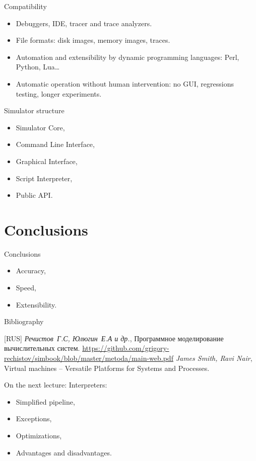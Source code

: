\begin{frame}{Compatibility}
\begin{itemize}
\item Debuggers, IDE, tracer and trace analyzers.
\item File formats: disk images, memory images, traces.
\item Automation and extensibility by dynamic programming languages: Perl,
  Python, Lua\dots
\item Automatic operation without human intervention: no GUI, regressions
  testing, longer experiments.
\end{itemize}
\end{frame}

\begin{frame}{Simulator structure}
\begin{itemize}
\item Simulator Core,
\item Command Line Interface,
\item Graphical Interface,
\item Script Interpreter,
\item Public API.
\end{itemize}
\end{frame}

\section*{Conclusions}

\begin{frame}{Conclusions}
\begin{itemize}
\item Accuracy,
\item Speed,
\item Extensibility.
\end{itemize}
\end{frame}

\begin{frame}[allowframebreaks]{Bibliography}
\begin{thebibliography}{99}
  \bibitem{} [RUS] \textit{Речистов~Г.С, Юлюгин~Е.А и др.},
    Программное моделирование вычислительных систем.
    \url{https://github.com/grigory-rechistov/simbook/blob/master/metoda/main-web.pdf}
  \bibitem{} \textit{James Smith, Ravi Nair}, Virtual machines -- Versatile
    Platforms for Systems and Processes.
\end{thebibliography}
\end{frame}

\begin{frame}{On the next lecture:}
Interpreters:
\begin{itemize}
\item Simplified pipeline,
\item Exceptions,
\item Optimizations,
\item Advantages and disadvantages.
\end{itemize}
\end{frame}

\finalslide


